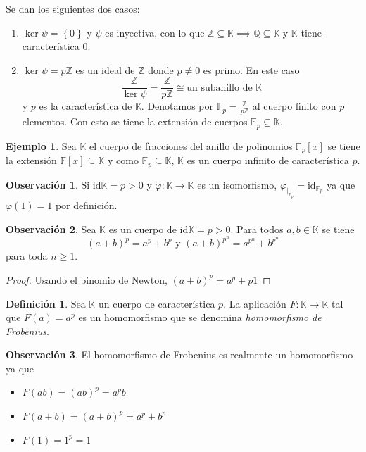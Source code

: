 \documentclass[10pt, spanish]{report}
\theoremstyle{definition}
\newtheorem*{defin}{Definición}
\newtheorem*{ej}{Ejemplo}
\newtheorem*{obs}{Observación}
\newcommand{\Z}{\mathbb{Z}}
\newcommand{\Q}{\mathbb{Q}}
\newcommand{\F}{\mathbb{F}}
\newcommand{\K}{\mathbb{K}}
\newcommand{\id}{\text{id}}
\newcommand{\car}{\text{id}}
\renewcommand{\geq}{\geqslant}
\newcommand{\completar}{\fbox{\textbf{¡Completar!}}}
\begin{document}
Se dan los siguientes dos casos:
\begin{enumerate}
    \item $\ker{\psi}=\left\{ 0 \right\}$ y $\psi$ es inyectiva, con lo que
        $\Z\subseteq\K \implies \Q\subseteq\K$ y $\K$ tiene característica 0.    
    \item $\ker{\psi}=p\Z$ es un ideal de $\Z$ donde $p\neq 0$ es primo. En este
        caso \[\frac{\Z}{\ker{\psi}}=\frac{\Z}{p\Z}\cong\text{un subanillo de }\K\] 
        y $p$ es la característica de $\K$. Denotamos por $\F_p=\frac{\Z}{p\Z}$
        al cuerpo finito con $p$ elementos. Con esto se tiene la extensión de
        cuerpos $\F_p\subseteq\K$.  
\end{enumerate}

\begin{ej}
    Sea $\K$ el cuerpo de fracciones del anillo de polinomios $\F_p[x]$ se tiene
    la extensión $\F[x]\subseteq\K$ y como $\F_p\subseteq\K$, $\K$ es un cuerpo
    infinito de característica $p$. 
\end{ej}

\begin{obs}
    Si $\car{\K} = p>0$ y  $\varphi:\K\to\K$ es un isomorfismo,
    $\varphi_{\mid_{\F_p}}=\id_{\F_p}$ ya que $\varphi(1)=1$ por definición. 
\end{obs}

\begin{obs}
    Sea $\K$ es un cuerpo de $\car{\K}=p>0$. Para todos $a,b\in\K$ se tiene
    \[(a+b)^p=a^p+b^p\text{ y }(a+b)^{p^n}=a^{p^n}+b^{p^n}\] 
    para toda $n\geq1$. 
\end{obs}

\begin{proof}
    Usando el binomio de Newton, $(a+b)^p=a^p+ {p}{1}$ 
    \completar
\end{proof}

\begin{defin}
    Sea $\K$ un cuerpo de característica $p$. La aplicación $F:\K\to\K$ tal
    que $F(a)=a^p$ es un homomorfismo que se denomina \textit{homomorfismo de
    Frobenius}. 
\end{defin}

\begin{obs}
    El homomorfismo de Frobenius es realmente un homomorfismo ya que
    \begin{itemize}
        \item $F(ab)=(ab)^p=a^pb$ 
        \item $F(a+b)=(a+b)^p=a^p+b^p$
        \item $F(1)=1^p=1$ 
    \end{itemize}
\end{obs}
\end{document}
